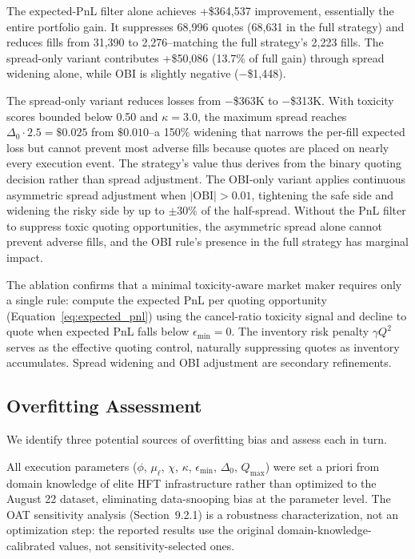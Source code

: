 \documentclass[11pt]{article}
\theoremstyle{definition}
\begin{document}
The expected-PnL filter alone achieves +\$364,537 improvement, essentially the entire portfolio gain. It suppresses 68,996 quotes (68,631 in the full strategy) and reduces fills from 31,390 to 2,276--matching the full strategy's 2,223 fills. The spread-only variant contributes +\$50,086 (13.7\% of full gain) through spread widening alone, while OBI is slightly negative ($-$\$1,448).

The spread-only variant reduces losses from $-$\$363K to $-$\$313K. With toxicity scores bounded below 0.50 and $\kappa = 3.0$, the maximum spread reaches $\Delta_0 \cdot 2.5 = \$0.025$ from $\$0.010$--a 150\% widening that narrows the per-fill expected loss but cannot prevent most adverse fills because quotes are placed on nearly every execution event. The strategy's value thus derives from the binary quoting decision rather than spread adjustment. The OBI-only variant applies continuous asymmetric spread adjustment when $|\text{OBI}| > 0.01$, tightening the safe side and widening the risky side by up to $\pm 30\%$ of the half-spread. Without the PnL filter to suppress toxic quoting opportunities, the asymmetric spread alone cannot prevent adverse fills, and the OBI rule's presence in the full strategy has marginal impact.

The ablation confirms that a minimal toxicity-aware market maker requires only a single rule: compute the expected PnL per quoting opportunity (Equation~\ref{eq:expected_pnl}) using the cancel-ratio toxicity signal and decline to quote when expected PnL falls below $\epsilon_{\min} = 0$. The inventory risk penalty $\gamma Q^2$ serves as the effective quoting control, naturally suppressing quotes as inventory accumulates. Spread widening and OBI adjustment are secondary refinements.

\subsection{Overfitting Assessment}
\label{sec:overfitting}

We identify three potential sources of overfitting bias and assess each in turn.

All execution parameters ($\phi$, $\mu_\ell$, $\chi$, $\kappa$, $\epsilon_{\min}$, $\Delta_0$, $Q_{\max}$) were set a priori from domain knowledge of elite HFT infrastructure rather than optimized to the August 22 dataset, eliminating data-snooping bias at the parameter level. The OAT sensitivity analysis (Section~9.2.1) is a robustness characterization, not an optimization step: the reported results use the original domain-knowledge-calibrated values, not sensitivity-selected ones.
\end{document}
